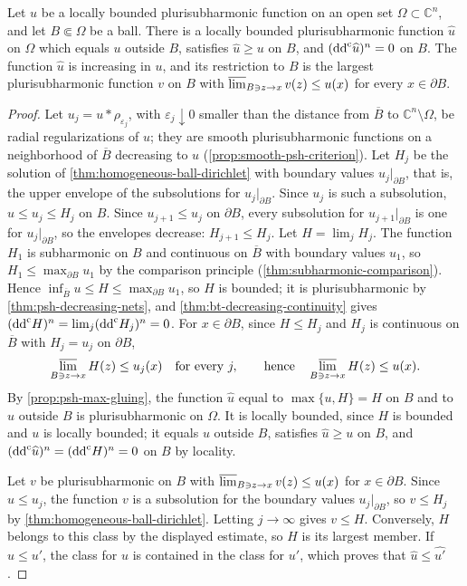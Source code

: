\begin{corollary}\label{cor:homogeneous-psh-balayage}
Let $u$ be a locally bounded plurisubharmonic function on an open set $\Omega\subset\mathbb C^n$, and let $B\Subset\Omega$ be a ball. There is a locally bounded plurisubharmonic function $\widehat u$ on $\Omega$ which equals $u$ outside $B$, satisfies $\widehat u\ge u$ on $B$, and $(\mathrm{dd}^{\mathrm{c}}\widehat u)^n=0$ on $B$. The function $\widehat u$ is increasing in $u$, and its restriction to $B$ is the largest plurisubharmonic function $v$ on $B$ with $\varlimsup_{B\ni z\to x}v(z)\le u(x)$ for every $x\in\partial B$.
\end{corollary}
\begin{proof}
Let $u_j=u*\rho_{\varepsilon_j}$, with $\varepsilon_j\downarrow0$ smaller than the distance from $\overline B$ to $\mathbb C^n\setminus\Omega$, be radial regularizations of $u$; they are smooth plurisubharmonic functions on a neighborhood of $\overline B$ decreasing to $u$ (\cref{prop:smooth-psh-criterion}). Let $H_j$ be the solution of \cref{thm:homogeneous-ball-dirichlet} with boundary values $u_j|_{\partial B}$, that is, the upper envelope of the subsolutions for $u_j|_{\partial B}$. Since $u_j$ is such a subsolution, $u\le u_j\le H_j$ on $B$. Since $u_{j+1}\le u_j$ on $\partial B$, every subsolution for $u_{j+1}|_{\partial B}$ is one for $u_j|_{\partial B}$, so the envelopes decrease: $H_{j+1}\le H_j$. Let $H=\lim_jH_j$. The function $H_1$ is subharmonic on $B$ and continuous on $\overline B$ with boundary values $u_1$, so $H_1\le\max_{\partial B}u_1$ by the comparison principle (\cref{thm:subharmonic-comparison}). Hence $\inf_{\overline B}u\le H\le\max_{\partial B}u_1$, so $H$ is bounded; it is plurisubharmonic by \cref{thm:psh-decreasing-nets}, and \cref{thm:bt-decreasing-continuity} gives $(\mathrm{dd}^{\mathrm{c}} H)^n=\lim_j(\mathrm{dd}^{\mathrm{c}} H_j)^n=0$. For $x\in\partial B$, since $H\le H_j$ and $H_j$ is continuous on $\overline B$ with $H_j=u_j$ on $\partial B$,
\[
 \varlimsup_{B\ni z\to x}H(z)\le u_j(x)\quad\text{for every }j,
 \qquad\text{hence}\quad\varlimsup_{B\ni z\to x}H(z)\le u(x).
\]
By \cref{prop:psh-max-gluing}, the function $\widehat u$ equal to $\max\{u,H\}=H$ on $B$ and to $u$ outside $B$ is plurisubharmonic on $\Omega$. It is locally bounded, since $H$ is bounded and $u$ is locally bounded; it equals $u$ outside $B$, satisfies $\widehat u\ge u$ on $B$, and $(\mathrm{dd}^{\mathrm{c}}\widehat u)^n=(\mathrm{dd}^{\mathrm{c}} H)^n=0$ on $B$ by locality.

Let $v$ be plurisubharmonic on $B$ with $\varlimsup_{B\ni z\to x}v(z)\le u(x)$ for $x\in\partial B$. Since $u\le u_j$, the function $v$ is a subsolution for the boundary values $u_j|_{\partial B}$, so $v\le H_j$ by \cref{thm:homogeneous-ball-dirichlet}. Letting $j\to\infty$ gives $v\le H$. Conversely, $H$ belongs to this class by the displayed estimate, so $H$ is its largest member. If $u\le u'$, the class for $u$ is contained in the class for $u'$, which proves that $\widehat u\le\widehat{u'}$.
\end{proof}

